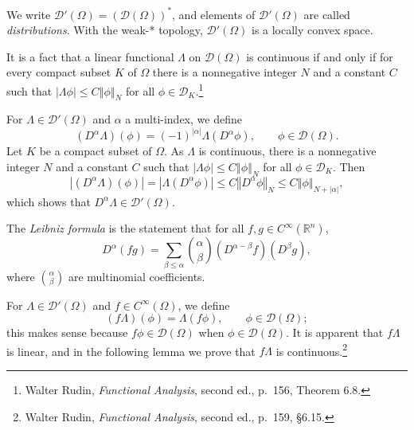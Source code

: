 \documentclass{article}
\newcommand{\norm}[1]{\left\Vert #1 \right\Vert}
\theoremstyle{definition}
\begin{document}
We write $\mathscr{D}'(\Omega)= (\mathscr{D}(\Omega))^*$, and elements of $\mathscr{D}'(\Omega)$ are called {\em distributions}. 
With the weak-* topology, $\mathscr{D}'(\Omega)$ is a locally convex space.

It is a fact that a linear functional  $\Lambda$ on $\mathscr{D}(\Omega)$ is continuous if and only if 
for every compact subset $K$ of $\Omega$ there is a nonnegative integer $N$ and a constant
$C$ such that $|\Lambda \phi| \leq C \norm{\phi}_N$ for all $\phi \in \mathscr{D}_K$.\footnote{Walter
Rudin, {\em Functional Analysis}, second ed., p.~156, Theorem 6.8.}


For $\Lambda \in \mathscr{D}'(\Omega)$ and $\alpha$ a multi-index,
 we define
\[
(D^\alpha \Lambda)(\phi) = (-1)^{|\alpha|} \Lambda(D^\alpha \phi), \qquad \phi \in \mathscr{D}(\Omega).
\]
Let $K$ be a compact subset of $\Omega$. As $\Lambda$ is continuous, there is a nonnegative integer $N$ and a constant
$C$ such that $|\Lambda \phi| \leq C \norm{\phi}_N$ for all $\phi \in \mathscr{D}_K$. Then
\[
|(D^\alpha \Lambda)(\phi)| = |\Lambda(D^\alpha \phi)| \leq C \norm{D^\alpha \phi}_N \leq C \norm{\phi}_{N+|\alpha|},
\]
which shows that $D^\alpha \Lambda \in \mathscr{D}'(\Omega)$. 


 The {\em Leibniz formula} is the statement that 
for all $f,g \in C^\infty(\mathbb{R}^n)$,  
\[
D^\alpha(fg) = \sum_{\beta \leq \alpha} \binom{\alpha}{\beta} (D^{\alpha-\beta}f)(D^\beta g),
\]
where $\binom{\alpha}{\beta}$ are multinomial coefficients.

For $\Lambda \in \mathscr{D}'(\Omega)$ and $f \in C^\infty(\Omega)$, we define 
\[
(f\Lambda)(\phi) = \Lambda(f\phi), \qquad \phi \in \mathscr{D}(\Omega);
\]
this makes sense because $f\phi \in \mathscr{D}(\Omega)$ when $\phi \in \mathscr{D}(\Omega)$. It is apparent that $f\Lambda$
is linear, and in the following lemma we prove that $f\Lambda$ is continuous.\footnote{Walter
Rudin, {\em Functional Analysis}, second ed., p.~159, \S 6.15.}
\end{document}

